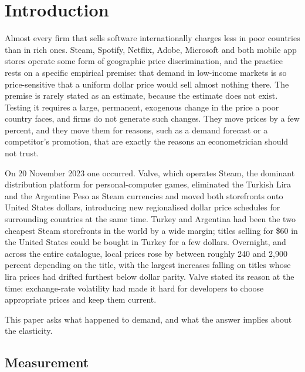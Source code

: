 \documentclass[11pt]{article}
\begin{document}
\newpage
\setcounter{page}{1}
\onehalfspacing

\section{Introduction}

Almost every firm that sells software internationally charges less in poor countries than in rich
ones. Steam, Spotify, Netflix, Adobe, Microsoft and both mobile app stores operate some form of
geographic price discrimination, and the practice rests on a specific empirical premise: that
demand in low-income markets is so price-sensitive that a uniform dollar price would sell almost
nothing there. The premise is rarely stated as an estimate, because the estimate does not exist.
Testing it requires a large, permanent, exogenous change in the price a poor country faces, and
firms do not generate such changes. They move prices by a few percent, and they move them for
reasons, such as a demand forecast or a competitor's promotion, that are exactly the reasons an
econometrician should not trust.

On 20 November 2023 one occurred. Valve, which operates Steam, the dominant distribution platform
for personal-computer games, eliminated the Turkish Lira and the Argentine Peso as Steam
currencies and moved both storefronts onto United States dollars, introducing new regionalised
dollar price schedules for surrounding countries at the same time. Turkey and Argentina had been
the two cheapest Steam storefronts in the world by a wide margin; titles selling for \$60 in the
United States could be bought in Turkey for a few dollars. Overnight, and across the entire
catalogue, local prices rose by between roughly 240 and 2{,}900 percent depending on the title,
with the largest increases falling on titles whose lira prices had drifted furthest below dollar
parity. Valve stated its reason at the time: exchange-rate volatility had made it hard for
developers to choose appropriate prices and keep them current.

This paper asks what happened to demand, and what the answer implies about the elasticity.

\subsection*{Measurement}
\end{document}
